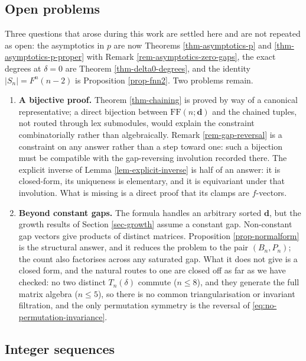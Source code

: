 \documentclass[11pt, a4paper, abstract=yes]{scrartcl}
\theoremstyle{definition}
\theoremstyle{remark}
\theoremstyle{plain}
\newcommand{\vek}[1]{\boldsymbol{#1}}
\begin{document}
\subsection{Open problems}
\label{sec:orge3a51f9}

Three questions that arose during this work are settled here and are not repeated as open: the
asymptotics in \(p\) are now Theorems \ref{thm-asymptotics-p}
and \ref{thm-asymptotics-p-proper} with Remark \ref{rem-asymptotics-zero-gaps}, the exact degrees at
\(\delta=0\) are Theorem \ref{thm-delta0-degrees}, and the identity \(\lvert S_n\rvert=F^n(n-2)\)
is Proposition \ref{prop-fnn2}. Two problems remain.

\begin{enumerate}
\item \textbf{A bijective proof.} Theorem \ref{thm-chaining} is proved by way of a canonical representative;
a direct bijection between \(\mathrm{FF}(n;\vek d)\) and the chained tuples, not routed through lex
submodules, would explain the constraint combinatorially rather than algebraically. Remark
\ref{rem-gap-reversal} is a constraint on any answer rather than a step toward one: such a
bijection must be compatible with the gap-reversing involution recorded there. The explicit
inverse of Lemma \ref{lem-explicit-inverse} is half of an answer: it is closed-form, its
uniqueness is elementary, and it is equivariant under that involution. What is missing is a
direct proof that its clamps are \(f\)-vectors.
\item \textbf{Beyond constant gaps.} The formula handles an arbitrary sorted \(\vek d\), but the growth results of
Section \ref{sec-growth} assume a constant gap. Non-constant gap vectors give products of distinct
matrices. Proposition \ref{prop-normalform} is the structural answer, and it reduces the problem
to the pair \((B_n,P_n)\); the count also factorises across any saturated gap. What it does not give
is a closed form, and the natural routes to one are closed off as far as we have checked: no two
distinct \(T_n(\delta)\) commute (\(n\le8\)), and they generate the full matrix algebra
(\(n\le5\)), so there is no common triangularisation or invariant filtration, and the only permutation symmetry is the reversal of
\eqref{eq:no-permutation-invariance}.
\end{enumerate}
\subsection{Integer sequences}
\label{sec:org31e9c17}
\end{document}
